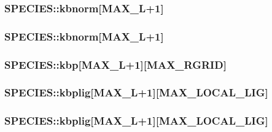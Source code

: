 \hypertarget{struct_s_p_e_c_i_e_s_a1144a586eda85c1dc27f1fee3dc034f4}{
\subsubsection[{kbnorm}]{ S\-P\-E\-C\-I\-E\-S\-::kbnorm\mbox{[}{\bf M\-A\-X\-\_\-\-L}+1\mbox{]}}}\label{struct_s_p_e_c_i_e_s_a1144a586eda85c1dc27f1fee3dc034f4}
\hypertarget{struct_s_p_e_c_i_e_s_ab21ae58f856858299cba1e32f06918b7}{
\subsubsection[{kbnorm}]{ S\-P\-E\-C\-I\-E\-S\-::kbnorm\mbox{[}{\bf M\-A\-X\-\_\-\-L}+1\mbox{]}}}\label{struct_s_p_e_c_i_e_s_ab21ae58f856858299cba1e32f06918b7}
\hypertarget{struct_s_p_e_c_i_e_s_ab2c40be47b06343e3b4bd599b9a68b38}{
\subsubsection[{kbp}]{ S\-P\-E\-C\-I\-E\-S\-::kbp\mbox{[}{\bf M\-A\-X\-\_\-\-L}+1\mbox{]}\mbox{[}{\bf M\-A\-X\-\_\-\-R\-G\-R\-I\-D}\mbox{]}}}\label{struct_s_p_e_c_i_e_s_ab2c40be47b06343e3b4bd599b9a68b38}
\hypertarget{struct_s_p_e_c_i_e_s_a1f39a23c5cb6ad0b1fd12f8144e39437}{
\subsubsection[{kbplig}]{ S\-P\-E\-C\-I\-E\-S\-::kbplig\mbox{[}{\bf M\-A\-X\-\_\-\-L}+1\mbox{]}\mbox{[}{\bf M\-A\-X\-\_\-\-L\-O\-C\-A\-L\-\_\-\-L\-I\-G}\mbox{]}}}\label{struct_s_p_e_c_i_e_s_a1f39a23c5cb6ad0b1fd12f8144e39437}
\hypertarget{struct_s_p_e_c_i_e_s_a3a893202fc8120adb5f83322d3b3be98}{
\subsubsection[{kbplig}]{ S\-P\-E\-C\-I\-E\-S\-::kbplig\mbox{[}{\bf M\-A\-X\-\_\-\-L}+1\mbox{]}\mbox{[}{\bf M\-A\-X\-\_\-\-L\-O\-C\-A\-L\-\_\-\-L\-I\-G}\mbox{]}}}\label{struct_s_p_e_c_i_e_s_a3a893202fc8120adb5f83322d3b3be98}
